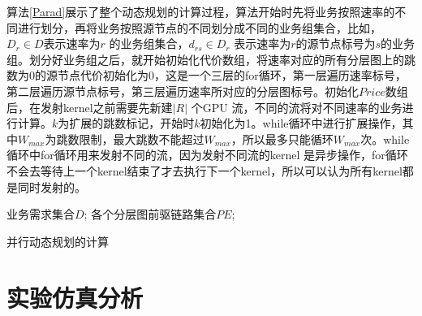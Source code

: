 算法\ref{Parad}展示了整个动态规划的计算过程，算法开始时先将业务按照速率的不同进行划分，再将业务按照源节点的不同划分成不同的业务组集合，比如，$D_r \in D$表示速率为$r$ 的业务组集合，$d_{rs} \in D_r$ 表示速率为$r$的源节点标号为$s$的业务组。划分好业务组之后，就开始初始化代价数组，将速率对应的所有分层图上的跳数为0的源节点代价初始化为0，这是一个三层的for循环，第一层遍历速率标号，第二层遍历源节点标号，第三层遍历速率所对应的分层图标号。初始化$Price$数组后，在发射kernel之前需要先新建$|R|$ 个GPU 流，不同的流将对不同速率的业务进行计算。$k$为扩展的跳数标记，开始时$k$初始化为1。while循环中进行扩展操作，其中$W_{max}$为跳数限制，最大跳数不能超过$W_{max}$，所以最多只能循环$W_{max}$次。while循环中for循环用来发射不同的流，因为发射不同流的kernel 是异步操作，for循环不会去等待上一个kernel结束了才去执行下一个kernel，所以可以认为所有kernel都是同时发射的。
\begin{algorithm}[t]
\begin{algorithmic}[1]
\Require
业务需求集合$D$;
各个分层图前驱链路集合$PE$;
\Else
{}
\EndIf
\EndFor
\EndFor
\EndFor
\EndFor
{}
\EndFor
{}
\EndWhile
{}
\end{algorithmic}
\caption{{并行动态规划的计算}}
\label{Parad}
\end{algorithm}


\section{实验仿真分析}
